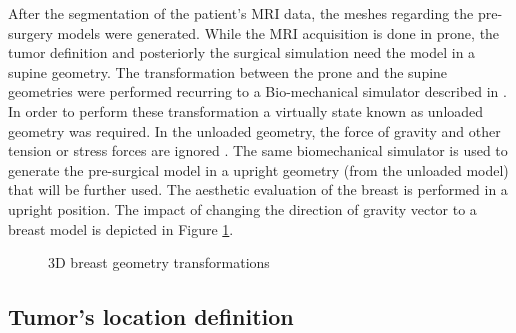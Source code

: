 After the segmentation of the patient's MRI data, the meshes regarding the pre-surgery models were generated. While the MRI acquisition is done in prone, the tumor definition and posteriorly the surgical simulation need the model in a supine geometry. The transformation between the prone and the supine geometries were performed recurring to a Bio-mechanical simulator described in \cite{Vavourakis2016}. In order to perform these transformation a virtually state known as unloaded geometry was required. In the unloaded geometry, the force of gravity and other tension or stress forces are ignored \cite{Iben2016}. The same biomechanical simulator is used to generate the pre-surgical model in a upright geometry (from the unloaded model) that will be further used. The aesthetic evaluation of the breast is performed in a upright position. The impact of changing the direction of gravity vector to a breast model is depicted in Figure \ref{fig:breast_geometry}.

\begin{figure}[!htb]
\centering
{}
\caption[3D breast geometry transformations]{3D breast geometry transformations}
\label{fig:breast_geometry}
\end{figure}


\subsection{Tumor's location definition}\label{subsection:tumor_location}

